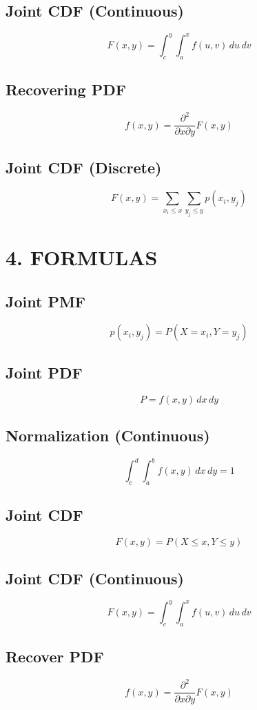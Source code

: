 \documentclass[12pt]{article}
\begin{document}
\subsection*{Joint CDF (Continuous)}
\[
F(x,y) = \int_c^y \int_a^x f(u,v)\,du\,dv
\]

\subsection*{Recovering PDF}
\[
f(x,y) = \frac{\partial^2}{\partial x \partial y} F(x,y)
\]

\subsection*{Joint CDF (Discrete)}
\[
F(x,y) = \sum_{x_i \le x} \sum_{y_j \le y} p(x_i,y_j)
\]

\section*{4. FORMULAS}

\subsection*{Joint PMF}
\[
p(x_i,y_j) = P(X = x_i, Y = y_j)
\]

\subsection*{Joint PDF}
\[
P = f(x,y)\,dx\,dy
\]

\subsection*{Normalization (Continuous)}
\[
\int_c^d \int_a^b f(x,y)\,dx\,dy = 1
\]

\subsection*{Joint CDF}
\[
F(x,y) = P(X \le x, Y \le y)
\]

\subsection*{Joint CDF (Continuous)}
\[
F(x,y) = \int_c^y \int_a^x f(u,v)\,du\,dv
\]

\subsection*{Recover PDF}
\[
f(x,y) = \frac{\partial^2}{\partial x \partial y} F(x,y)
\]
\end{document}
